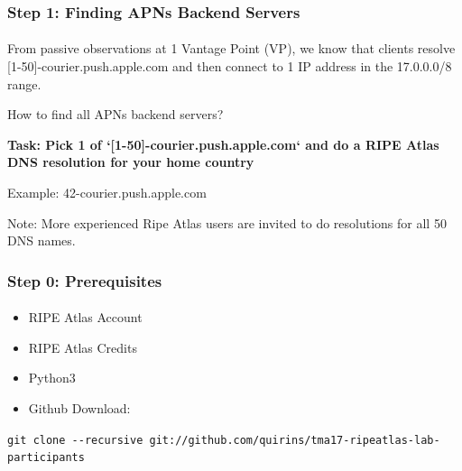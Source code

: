 
\begin{frame}
\frametitle{Step 1: Finding APNs Backend Servers}
\framesubtitle{}

From passive observations at 1 Vantage Point (VP), we know that clients resolve [1-50]-courier.push.apple.com and then connect to 1 IP address in the 17.0.0.0/8 range.

How to find all APNs backend servers?
\pause

\textbf{Task: Pick 1 of `[1-50]-courier.push.apple.com` and do a RIPE Atlas DNS resolution for your home country}

Example: 42-courier.push.apple.com

Note: More experienced Ripe Atlas users are invited to do resolutions for all 50 DNS names.

\end{frame}
\clearpage
\begin{frame}
\frametitle{Step 0: Prerequisites}
\framesubtitle{}
\begin{itemize}
	\item RIPE Atlas Account
	\item RIPE Atlas Credits
	\item Python3
	\item Github Download:
\end{itemize}

\texttt{git clone -{}-recursive git://github.com/quirins/tma17-ripeatlas-lab-participants}

\end{frame}
\clearpage

